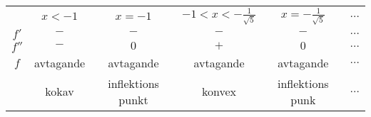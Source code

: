   \begin{center}
  \begin{tabular}{ |c|c|c|c|c|c| } 
  \hline
          & $x<-1$    & $x=-1$            & $-1<x<-\frac{1}{\sqrt{5}}$ & $x=-\frac{1}{\sqrt{5}}$ & $\dots$ \\ 
  $f'$   & $-$       & $-$               & $-$                        & $-$                     & $\dots$ \\ 
  $f''$  & $-$       & $0$               & $+$                        & $0$                     & $\dots$ \\
  $f$    & avtagande & avtagande         & avtagande                  & avtagande               & $\dots$ \\
          & kokav     & inflektions punkt & konvex                     & inflektions punk        & $\dots$ \\
  \hline
  \end{tabular}
  \end{center}

